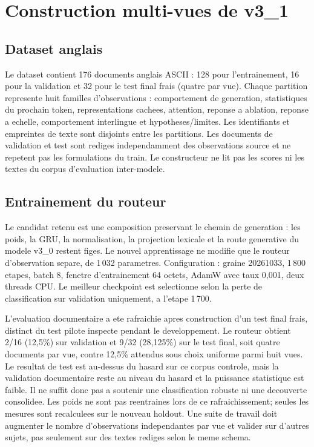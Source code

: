\documentclass[11pt,a4paper]{article}
\newcommand{\code}[1]{\texttt{\detokenize{#1}}}
\begin{document}
\section{Construction multi-vues de v3\_1}
\subsection{Dataset anglais}
Le dataset \code{NG-Multiview-Observation-English-v3_1} contient 176 documents anglais ASCII : 128 pour l'entrainement, 16 pour la validation et 32 pour le test final frais (quatre par vue). Chaque partition represente huit familles d'observations : comportement de generation, statistiques du prochain token, representations cachees, attention, reponse a ablation, reponse a echelle, comportement interlingue et hypotheses/limites. Les identifiants et empreintes de texte sont disjoints entre les partitions. Les documents de validation et test sont rediges independamment des observations source et ne repetent pas les formulations du train. Le constructeur ne lit pas les scores ni les textes du corpus d'evaluation inter-modele.

\subsection{Entrainement du routeur}
Le candidat retenu est une composition preservant le chemin de generation : les poids, la GRU, la normalisation, la projection lexicale et la route generative du modele v3\_0 restent figes. Le nouvel apprentissage ne modifie que le routeur d'observation separe, de 1\,032 parametres. Configuration : graine 20261033, 1\,800 etapes, batch 8, fenetre d'entrainement 64 octets, AdamW avec taux 0,001, deux threads CPU. Le meilleur checkpoint est selectionne selon la perte de classification sur validation uniquement, a l'etape 1\,700.

L'evaluation documentaire a ete rafraichie apres construction d'un test final frais, distinct du test pilote inspecte pendant le developpement. Le routeur obtient 2/16 (12,5\%) sur validation et 9/32 (28,125\%) sur le test final, soit quatre documents par vue, contre 12,5\% attendus sous choix uniforme parmi huit vues. Le resultat de test est au-dessus du hasard sur ce corpus controle, mais la validation documentaire reste au niveau du hasard et la puissance statistique est faible. Il ne suffit donc pas a soutenir une classification robuste ni une decouverte consolidee. Les poids ne sont pas reentraines lors de ce rafraichissement; seules les mesures sont recalculees sur le nouveau holdout. Une suite de travail doit augmenter le nombre d'observations independantes par vue et valider sur d'autres sujets, pas seulement sur des textes rediges selon le meme schema.
\end{document}
